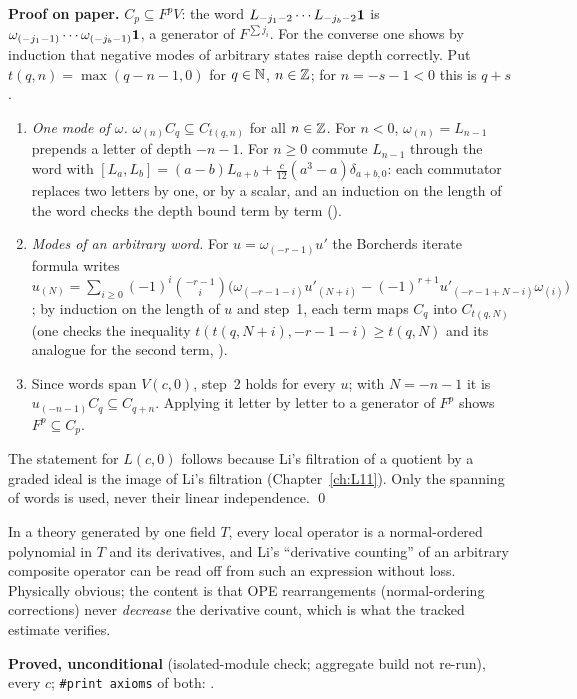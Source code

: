 \textbf{Proof on paper.} $C_p\subseteq F^pV$: the word $L_{-j_1-2}\cdots L_{-j_b-2}\mathbf{1}$ is
$\omega_{(-j_1-1)}\cdots\omega_{(-j_b-1)}\mathbf{1}$, a generator of $F^{\sum j_i}$. For the converse one shows by
induction that negative modes of arbitrary states raise depth correctly. Put $t(q,n)=\max(q-n-1,0)$ for $q\in{\mathbb{N}}$,
$n\in{\mathbb{Z}}$; for $n=-s-1<0$ this is $q+s$.
\begin{enumerate}
\item \emph{One mode of $\omega$.} $\omega_{(n)}C_q\subseteq C_{t(q,n)}$ for all $n\in{\mathbb{Z}}$. For $n<0$, $\omega_{(n)}=L_{n-1}$
  prepends a letter of depth $-n-1$. For $n\ge0$ commute $L_{n-1}$ through the word with $[L_a,L_b]=(a-b)L_{a+b}+
  \frac{c}{12}(a^3-a)\delta_{a+b,0}$: each commutator replaces two letters by one, or by a scalar, and an induction on the
  length of the word checks the depth bound term by term ().
\item \emph{Modes of an arbitrary word.} For $u=\omega_{(-r-1)}u'$ the Borcherds iterate formula writes
  $u_{(N)}=\sum_{i\ge0}(-1)^i\binom{-r-1}{i}\bigl(\omega_{(-r-1-i)}u'_{(N+i)}-(-1)^{r+1}u'_{(-r-1+N-i)}\omega_{(i)}\bigr)$; by
  induction on the length of $u$ and step~1, each term maps $C_q$ into $C_{t(q,N)}$ (one checks the inequality
  $t(t(q,N+i),-r-1-i)\ge t(q,N)$ and its analogue for the second term, ).
\item Since words span $V(c,0)$, step~2 holds for every $u$; with $N=-n-1$ it is
  $u_{(-n-1)}C_q\subseteq C_{q+n}$. Applying it letter by letter to a generator of $F^p$ shows $F^p\subseteq C_p$.
\end{enumerate}
The statement for $L(c,0)$ follows because Li's filtration of a quotient by a graded ideal is the image of Li's
filtration (Chapter~\ref{ch:L11}). Only the spanning of words is used, never their linear independence. \qed

\begin{physics}
In a theory generated by one field $T$, every local operator is a normal-ordered polynomial in $T$ and its
derivatives, and Li's ``derivative counting'' of an arbitrary composite operator can be read off from such an
expression without loss. Physically obvious; the content is that OPE rearrangements (normal-ordering corrections) never
\emph{decrease} the derivative count, which is what the tracked estimate verifies.
\end{physics}

\begin{status}
\textbf{Proved, unconditional} (isolated-module check; aggregate build not re-run), every $c$; \texttt{\#print axioms} of both: .
\end{status}

